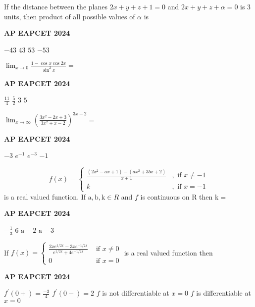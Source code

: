 \documentclass[11pt,paper=a4,answers]{exam}
\begin{document}
\begin{multicols}{2}
\begin{questions}
\question
If the distance between the planes $2 x+y+z+1=0$ and $2 x+y+z+\alpha=0$ is 3 units, then product of all possible values of $\alpha$ is
\begin{flushright}
\small\textbf{AP EAPCET 2024}
\end{flushright}
\begin{choices}
  \choice $-43$
  \choice $43$ 
  \choice $53$ 
  \choice $-53$
\end{choices}

\question
$\lim _{x \rightarrow 0} \frac{1-\cos x \cos 2 x}{\sin ^2 x}=$
\begin{flushright}
\small\textbf{AP EAPCET 2024}
\end{flushright}
\begin{choices}
  \choice $\frac{11}{4}$
  \choice $\frac{5}{2}$ 
  \choice $3$ 
  \choice $5$
\end{choices}

\question
$\lim _{x \rightarrow \infty}\left(\frac{3 x^2-2 x+3}{3 x^2+x-2}\right)^{3 x-2}=$
\begin{flushright}
\small\textbf{AP EAPCET 2024}
\end{flushright}
\begin{choices}
  \choice $-3$
  \choice $e^{-1}$
  \choice $e^{-3}$
  \choice $-1$
\end{choices}

\question
$$
f(x)= \begin{cases}\frac{\left(2 x^2-a x+1\right)-\left(a x^2+3 b x+2\right)}{x+1} & , \text { if } x \neq-1 \\ k & , \text { if } x=-1\end{cases}
$$
is a real valued function. If $\mathrm{a}, \mathrm{b}, \mathrm{k} \in R$ and $f$ is continuous on R then $\mathrm{k}=$
\begin{flushright}
\small\textbf{AP EAPCET 2024}
\end{flushright}
\begin{choices}
  \choice $-\frac{1}{3}$
  \choice $6$ 
  \choice $\mathrm{a}-2$ 
  \choice $\mathrm{a}-3$
\end{choices}

\question
If $f(x)=\left\{\begin{array}{cc}\frac{2 x e^{1 / 2 x}-3 x e^{-1 / 2 x}}{e^{1 / 2 x}+4 e^{-1 / 2 x}} & \text { if } x \neq 0 \\ 0 & \text { if } x=0\end{array}\right.$ is a real valued function then
\begin{flushright}
\small\textbf{AP EAPCET 2024}
\end{flushright}
\begin{choices}
  \choice $f^{\prime}(0+)=\frac{-3}{4}$
  \choice $f^{\prime}(0-)=2$
  \choice $f$ is not differentiable at $x=0$
  \choice $f$ is differentiable at $x=0$
\end{choices}


\end{questions}
\end{multicols}
\end{document}
